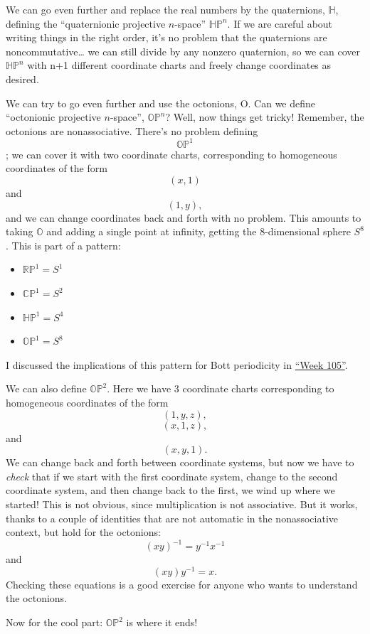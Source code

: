 \documentclass{article}
\def\tightlist{}
\begin{document}
We can go even further and replace the real numbers by the quaternions,
\(\mathbb{H}\), defining the ``quaternionic projective \(n\)-space''
\(\mathbb{HP}^n\). If we are careful about writing things in the right
order, it's no problem that the quaternions are noncommutative\ldots{}
we can still divide by any nonzero quaternion, so we can cover
\(\mathbb{HP}^n\) with n+1 different coordinate charts and freely change
coordinates as desired.

We can try to go even further and use the octonions, O. Can we define
``octonionic projective \(n\)-space'', \(\mathbb{OP}^n\)? Well, now
things get tricky! Remember, the octonions are nonassociative. There's
no problem defining \[\mathbb{OP}^1\]; we can cover it with two
coordinate charts, corresponding to homogeneous coordinates of the form
\[(x, 1)\] and \[(1, y),\] and we can change coordinates back and forth
with no problem. This amounts to taking \(\mathbb{O}\) and adding a
single point at infinity, getting the 8-dimensional sphere \(S^8\). This
is part of a pattern:

\begin{itemize}
\tightlist
\item
  \(\mathbb{RP}^1 = S^1\)
\item
  \(\mathbb{CP}^1 = S^2\)
\item
  \(\mathbb{HP}^1 = S^4\)
\item
  \(\mathbb{OP}^1 = S^8\)
\end{itemize}

I discussed the implications of this pattern for Bott periodicity in
\protect\hyperlink{week105}{``Week 105''}.

We can also define \(\mathbb{OP}^2\). Here we have 3 coordinate charts
corresponding to homogeneous coordinates of the form \[(1, y, z),\]
\[(x, 1, z),\] and \[(x, y, 1).\] We can change back and forth between
coordinate systems, but now we have to \emph{check} that if we start
with the first coordinate system, change to the second coordinate
system, and then change back to the first, we wind up where we started!
This is not obvious, since multiplication is not associative. But it
works, thanks to a couple of identities that are not automatic in the
nonassociative context, but hold for the octonions:
\[(xy)^{-1} = y^{-1} x^{-1}\] and \[(xy)y^{-1} = x.\] Checking these
equations is a good exercise for anyone who wants to understand the
octonions.

Now for the cool part: \(\mathbb{OP}^2\) is where it ends!
\end{document}
